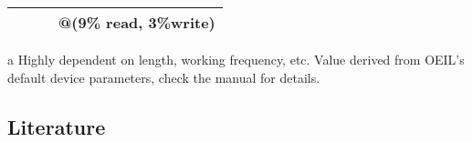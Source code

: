 \documentclass[11pt]{article}
\begin{document}
\begin{table}[!htb]
\begin{adjustbox}{max width=\textwidth}
\begin{threeparttable}
\begin{tabular}{l r r r}
				                                      &                           &                                 & @(9\% read, 3\%write)          \\ \bottomrule
			\end{tabular}
			\begin{tablenotes}
				\newcommand{\CORNERSTONE}{\href{run:./appendix/CORNERSTONE-Standard-Components-Library-SOI.pdf}{CORNERSTONE}}
				\scriptsize
				\item [a] Highly dependent on length, working frequency, etc. Value derived from OEIL's default device parameters, check the manual for details.
			\end{tablenotes}
		\end{threeparttable}
	\end{adjustbox}
\end{table}

\blindtext

\subsection{Literature}
\end{document}
